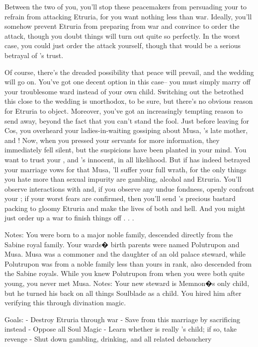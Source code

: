 \documentclass[char]{Kos}
\begin{document}
Between the two of you, you'll stop these peacemakers from persuading your \cScythiaKing{\spouse} to refrain from attacking Etruria, for you want nothing less than war. Ideally, you'll somehow prevent Etruria from preparing from war and convince \cScythiaKing{\nickname} to order the attack, though you doubt things will turn out quite so perfectly. In the worst case, you could just order the attack yourself, though that would be a serious betrayal of \cScythiaKing{\nickname}'s trust.

Of course, there's the dreaded possibility that peace will prevail, and the wedding will go on. You've got one decent option in this case-- you must simply marry off your troublesome ward instead of your own child. Switching out the betrothed this close to the wedding is unorthodox, to be sure, but there's no obvious reason for Etruria to object. Moreover, you've got an increasingly tempting reason to send \cWard{\them} away,  beyond the fact that you can't stand the fool. Just before leaving for Cos, you overheard your ladies-in-waiting gossiping about Musa, \cWard{\nickname}'s late mother, and \cScythiaKing{}! Now, when you pressed your servants for more information, they immediately fell silent, but the suspicions have been planted in your mind. You want to trust your \cScythiaKing{\spouse}, and \cScythiaKing{\they}'s innocent, in all likelihood. But if \cScythiaKing{} has indeed betrayed your marriage vows for that Musa, \cScythiaKing{\they}'ll suffer your full wrath, for the only things you hate more than sexual impurity are gambling, alcohol and Etruria. You'll observe \cScythiaKing{\their} interactions with \cWard{\nickname} and, if you observe any undue fondness, openly confront your \cScythiaKing{\spouse}; if your worst fears are confirmed, then you'll send \cScythiaKing{}'s precious bastard packing to gloomy Etruria and make the lives of both \cScythiaKing{\parent} and \cWard{\child} hell. And you might just order up a war to finish things off . . .

Notes: You were born to a major noble family, descended directly from the Sabine royal family. Your wards� birth parents were named Polutrupon and Musa. Musa was a commoner and the daughter of an old palace steward, while Polutrupon was from a noble family less than yours in rank, also descended from the Sabine royals. While you knew Polutrupon from when you were both quite young, you never met Musa.
Notes: Your new steward is Memnon�s only child, but he turned his back on all things Soulblade as a child. You hired him after verifying this through divination magic. 

Goals:
- Destroy Etruria through war
- Save \cBride{\child} from this marriage by sacrificing \cWard{\nickname} instead
- Oppose all Soul Magic
- Learn whether \cWard{\nickname} is really \cScythiaKing{\nickname}'s child; if so, take revenge
- Shut down gambling, drinking, and all related debauchery
\end{document}
